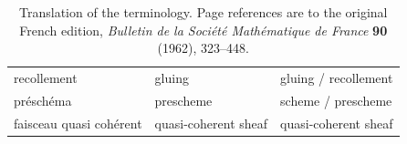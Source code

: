 \begin{table}[htbp]
\begin{tabular}{p{} p{} p{}}
    recollement                 & gluing                       & gluing / recollement\\
    préschéma                   & prescheme                    & scheme / prescheme\\
    faisceau quasi cohérent     & quasi-coherent sheaf        & quasi-coherent sheaf\\
    \hline
  \end{tabular}
  \caption{Translation of the terminology.  Page references are to the
  original French edition, \emph{Bulletin de la Société Mathématique de
  France} \textbf{90} (1962), 323--448.}
  \label{tab:terminology}
\end{table}